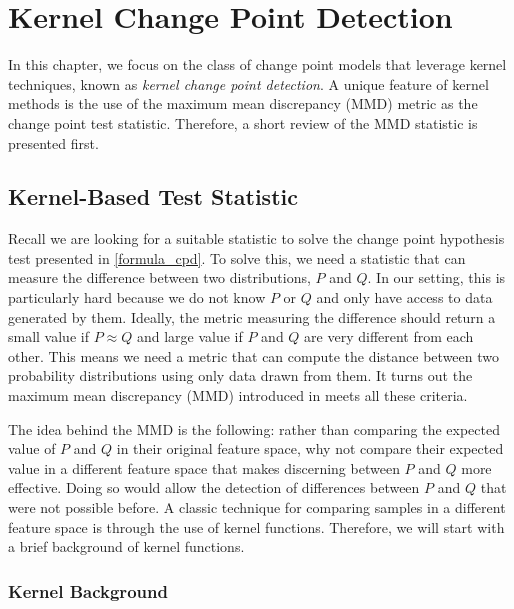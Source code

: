 \chapter{Kernel Change Point Detection}
\label{chapter3}
In this chapter, we focus on the class of change point models that leverage kernel techniques, known as \textit{kernel change point detection}. A unique feature of kernel methods is the use of the maximum mean discrepancy (MMD) metric as the change point test statistic. Therefore, a short review of the MMD statistic is presented first.



\section{Kernel-Based Test Statistic}
\label{mmd}
Recall we are looking for a suitable statistic to solve the change point hypothesis test presented in \ref{formula_cpd}. To solve this, we need a statistic that can measure the difference between two distributions, $P$ and $Q$. In our setting, this is particularly hard because we do not know $P$ or $Q$ and only have access to data generated by them. Ideally, the metric measuring the difference should return a small value if $P \approx  Q$ and large value if $P$ and $Q$ are very different from each other. This means we need a metric that can compute the distance between two probability distributions using only data drawn from them. It turns out the maximum mean discrepancy (MMD) introduced in \cite{gretton2012kernel} meets all these criteria.

The idea behind the MMD is the following: rather than comparing the expected value of $P$ and $Q$ in their original feature space, why not compare their expected value in a different feature space that makes discerning between $P$ and $Q$ more effective. Doing so would allow the detection of differences between $P$ and $Q$ that were not possible before. A classic technique for comparing samples in a different feature space is through the use of kernel functions. Therefore, we will start with a brief background of kernel functions.

\subsection{Kernel Background}

